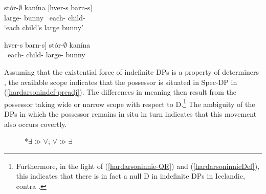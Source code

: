 \documentclass[output=paper]{langscibook}
\begin{document}
\begin{exe}
\settowidth\jamwidth {*$\exists \gg \forall$; $\forall \gg \exists$}
\ex	\label{hardarsoninnie-QR}
	\begin{xlist}
		\ex	\gll	stór-$\emptyset$ kanína [hver-s barn-s] \label{hardarsonindef-postnom}\\
					large-{\hardStr} bunny	~each-{\hardGen} child-{\hardGen}\\ \jambox{$\exists \gg \forall$; $\forall \gg \exists$}
			\glt	`each child's large bunny'  
	
		\ex	\gll	{[}hver-s barn-s] stór-$\emptyset$ kanína \label{hardarsonindef-preadj}\\
					~each-{\hardGen} child-{\hardGen} large-{\hardStr} bunny\\ \jambox{*$\exists \gg \forall$; $\forall \gg \exists$}
			\glt 	
	\end{xlist}
\end{exe}

\noindent Assuming that the existential force of indefinite DPs is a property of determiners  \citep[cf.][]{chierchia1992}, the available scope indicates that the possessor is situated in Spec-DP in (\ref{hardarsonindef-preadj}). The differences in meaning then result from the possessor taking wide or narrow scope with respect to D.\footnote{Furthermore, in the light of (\ref{hardarsoninnie-QR}) and (\ref{hardarsoninnieDef}), this indicates that there is in fact a null D in indefinite DPs in Icelandic, contra \citet{Hardarson:2016wd}.} The ambiguity of the DPs in which the possessor remains in situ in turn indicates that this movement also occurs covertly.

\begin{figure}
\captionsetup{margin=.05\linewidth}
\begin{floatrow}
        {\caption{$\exists \gg \forall$; $\forall \gg \exists$}}
        {\caption{*$\exists \gg \forall$; $\forall \gg \exists$}}
\end{floatrow}
\end{figure}
\end{document}
